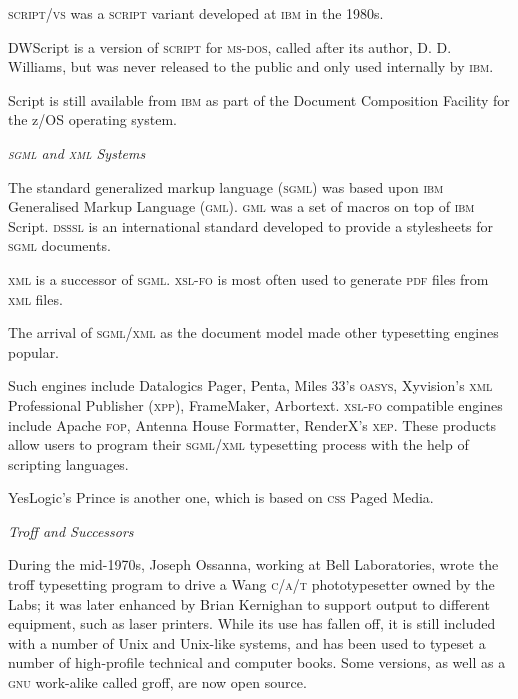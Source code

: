 \documentclass{slipbox}
\makeatletter
\def\subsection#1{\addvspace{\baselineskip}\noindent\textit{#1}\par\addvspace{\baselineskip}\@afterheading\@afterindentfalse}
\makeatother
\begin{document}
\begin{slip}
    \textsc{script/vs} was a \textsc{script} variant developed at \textsc{ibm} in the 1980s.

    DWScript is a version of \textsc{script} for \textsc{ms-dos}, called after its author, D. D. Williams, but was never released to the public and only used internally by \textsc{ibm}.

    Script is still available from \textsc{ibm} as part of the Document Composition Facility for the z/OS operating system.

    \subsection{\textsc{sgml} and \textsc{xml} Systems}
    The standard generalized markup language (\textsc{sgml}) was based upon \textsc{ibm} Generalised Markup Language (\textsc{gml}). \textsc{gml} was a set of macros on top of \textsc{ibm} Script. \textsc{dsssl} is an international standard developed to provide a stylesheets for \textsc{sgml} documents.

    \textsc{xml} is a successor of \textsc{sgml}. \textsc{xsl-fo} is most often used to generate \textsc{pdf} files from \textsc{xml} files.

    The arrival of \textsc{sgml}/\textsc{xml} as the document model made other typesetting engines popular.

    Such engines include Datalogics Pager, Penta, Miles 33's \textsc{oasys}, Xyvision's \textsc{xml} Professional Publisher (\textsc{xpp}), FrameMaker, Arbortext. \textsc{xsl-fo} compatible engines include Apache \textsc{fop}, Antenna House Formatter, RenderX's \textsc{xep}. These products allow users to program their \textsc{sgml}/\textsc{xml} typesetting process with the help of scripting languages.

    YesLogic's Prince is another one, which is based on \textsc{css} Paged Media.

    \subsection{Troff and Successors}
    During the mid-1970s, Joseph Ossanna, working at Bell Laboratories, wrote the troff typesetting program to drive a Wang \textsc{c/a/t} phototypesetter owned by the Labs; it was later enhanced by Brian Kernighan to support output to different equipment, such as laser printers. While its use has fallen off, it is still included with a number of Unix and Unix-like systems, and has been used to typeset a number of high-profile technical and computer books. Some versions, as well as a \textsc{gnu} work-alike called groff, are now open source.


\end{slip}
\end{document}
